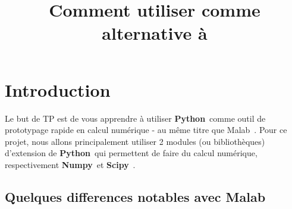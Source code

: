 \documentclass[11pt,a4wide]{article}
\title{Comment utiliser \python comme alternative à \matlab}
\newcommand{\matlab}{{\ECFTeenSpirit Malab}\ }
\newcommand{\python}{{\bf Python}\ }
\newcommand{\numpy}{{\bf Numpy}\ }
\newcommand{\scipy}{{\bf Scipy}\ }
\begin{document}
\maketitle
\section{Introduction}
  Le but de TP est de vous apprendre à utiliser \python comme outil de prototypage rapide en calcul numérique - au
  même titre que \matlab.
  Pour ce projet, nous allons principalement utiliser 2 modules (ou bibliothèques) d'extension de \python qui
  permettent de faire du calcul numérique, respectivement \numpy et \scipy.

  \subsection{Quelques differences notables avec \matlab}
\end{document}
